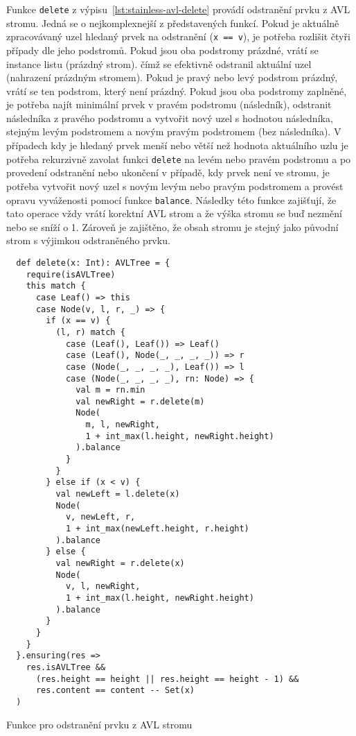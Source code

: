 Funkce \texttt{delete} z výpisu~\ref{lst:stainless-avl-delete}
provádí odstranění prvku z AVL stromu.
Jedná se o nejkomplexnejší z představených funkcí.
Pokud je aktuálně zpracovávaný uzel hledaný prvek na odstranění (\texttt{x == v}),
je potřeba rozlišit čtyři případy dle jeho podstromů.
Pokud jsou oba podstromy prázdné, vrátí se instance listu (prázdný strom).
čímž se efektivně odstranil aktuální uzel (nahrazení prázdným stromem).
Pokud je pravý nebo levý podstrom prázdný,
vrátí se ten podstrom, který není prázdný.
Pokud jsou oba podstromy zaplněné,
je potřeba najít minimální prvek v pravém podstromu (následník),
odstranit následníka z pravého podstromu
a vytvořit nový uzel s hodnotou následníka, stejným levým podstromem
a novým pravým podstromem (bez následníka).
V případech kdy je hledaný prvek menší nebo větší než hodnota aktuálního uzlu
je potřeba rekurzivně zavolat funkci \texttt{delete} na levém nebo pravém podstromu
a po provedení odstranění nebo ukončení v případě, kdy prvek není ve stromu,
je potřeba vytvořit nový uzel s novým levým nebo pravým podstromem
a provést opravu vyváženosti pomocí funkce \texttt{balance}.
Následky této funkce zajišťují, že tato operace vždy vrátí korektní AVL strom
a že výška stromu se buď nezmění nebo se sníží o 1.
Zároveň je zajištěno, že obsah stromu je stejný jako původní strom
s výjimkou odstraněného prvku.

\begin{listing}[H]
  \begin{verbatim}
  def delete(x: Int): AVLTree = {
    require(isAVLTree)
    this match {
      case Leaf() => this
      case Node(v, l, r, _) => {
        if (x == v) {
          (l, r) match {
            case (Leaf(), Leaf()) => Leaf()
            case (Leaf(), Node(_, _, _, _)) => r
            case (Node(_, _, _, _), Leaf()) => l
            case (Node(_, _, _, _), rn: Node) => {
              val m = rn.min
              val newRight = r.delete(m)
              Node(
                m, l, newRight,
                1 + int_max(l.height, newRight.height)
              ).balance
            }
          }
        } else if (x < v) {
          val newLeft = l.delete(x)
          Node(
            v, newLeft, r,
            1 + int_max(newLeft.height, r.height)
          ).balance
        } else {
          val newRight = r.delete(x)
          Node(
            v, l, newRight,
            1 + int_max(l.height, newRight.height)
          ).balance
        }
      }
    }
  }.ensuring(res =>
    res.isAVLTree &&
      (res.height == height || res.height == height - 1) &&
      res.content == content -- Set(x)
  )
  \end{verbatim}
  \caption{Funkce pro odstranění prvku z AVL stromu}
  \label{lst:stainless-avl-delete}
\end{listing}

